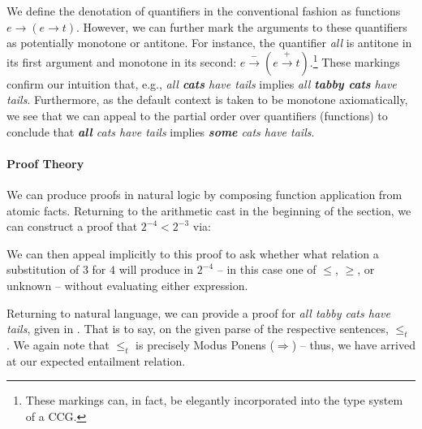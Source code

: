 We define the denotation of quantifiers in the conventional
  fashion as functions $e \rightarrow (e \rightarrow t)$.
However, we can further mark the arguments to these quantifiers as
  potentially monotone or antitone.
For instance, the quantifier \textit{all} is antitone in its first
  argument and monotone in its second:
  $e \xrightarrow{-} (e \xrightarrow{+} t)$.\footnote{
    These markings can, in fact, be elegantly incorporated into the
    type system \cite{key:2014icard-natlog} of a CCG.
  }
These markings confirm our intuition that, e.g., 
  \textit{all \textbf{cats} have tails}
  implies 
  \textit{all \textbf{tabby cats} have tails}.
Furthermore, as the default context is taken to be monotone
  axiomatically, we see that we can appeal to the partial order
  over quantifiers (functions) to conclude that
  \textit{\textbf{all} cats have tails}
  implies 
  \textit{\textbf{some} cats have tails}.

\paragraph{Proof Theory}
We can produce proofs in natural logic by composing
  function application from atomic facts.
Returning to the arithmetic cast in the beginning of the section, we
  can construct a proof that $2^{-4} < 2^{-3}$ via:

\begin{prooftree}
\end{prooftree}

We can then appeal implicitly to this proof to ask whether what relation
  a substitution of $3$ for $4$ will produce in $2^{-4}$ -- in this case
  one of $\leq$, $\geq$, or unknown -- without evaluating either
  expression.


Returning to natural language, we can provide a proof for
  \textit{all tabby cats have tails}, given in .
That is to say, on the given parse of the respective sentences,
   $\leq_t$ .
We again note that $\leq_t$ is precisely Modus
  Ponens ($\Rightarrow$) -- thus, we have arrived at our expected
  entailment relation.

